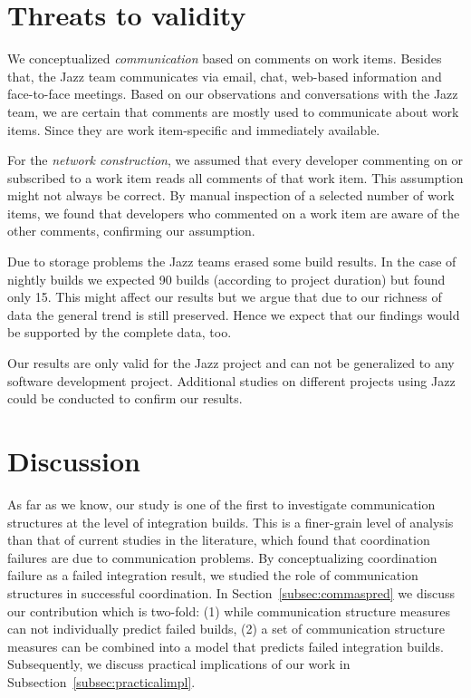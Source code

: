 \documentclass[12pt,oneside]{book}
\begin{document}
\section{Threats to validity}
We conceptualized \emph{communication} based on comments on work items. Besides
that, the Jazz team communicates via email, chat, web-based information and
face-to-face meetings. Based on our observations and conversations with the Jazz
team, we are certain that comments are mostly used to communicate about work
items. Since they are work item-specific and immediately available.

For the \emph{network construction}, we assumed that every developer commenting
on or subscribed to a work item reads all comments of that work item. This
assumption might not always be correct. By manual inspection of a selected number
of work items, we found that developers who commented on a work item are aware of
the other comments, confirming our assumption.

Due to storage problems the Jazz teams erased some build results. In the case of
nightly builds we expected 90 builds (according to project duration) but found
only 15. This might affect our results but we argue that due to our richness of
data the general trend is still preserved. Hence we expect that our findings
would be supported by the complete data, too.

Our results are only valid for the Jazz project and can not be generalized to
any software development project. Additional studies on different projects
using Jazz could be conducted to confirm our results.



\section{Discussion}
\label{sec:discussion}
As far as we know, our study is one of the first to investigate communication
structures at the level of integration builds. This is a finer-grain level of
analysis than that of current studies in the literature, which found that
coordination failures are due to communication problems. By conceptualizing
coordination failure as a failed integration result, we studied the role of
communication structures in successful coordination. In
Section~\ref{subsec:commaspred} we discuss our contribution which is two-fold:
(1) while communication structure measures can not individually predict failed
builds, (2) a set of communication structure measures can be combined into a
model that predicts failed integration builds. Subsequently, we discuss practical
implications of our work in Subsection~\ref{subsec:practicalimpl}.
\end{document}
